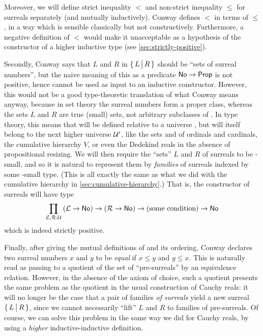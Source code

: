 Moreover, we will define strict inequality $<$ and non-strict inequality $\le$ for surreals separately (and mutually inductively).
Conway defines $<$ in terms of $\le$, in a way which is sensible classically but not constructively.
%
Furthermore, a negative definition of $<$ would make it unacceptable as a hypothesis of the constructor of a higher inductive type (see \cref{sec:strictly-positive}).

Secondly, Conway says that $L$ and $R$ in $\{\,L\,\big|\,R\,\}$ should be ``sets of surreal numbers'', but the naive meaning of this as a predicate $\mathsf{No}\to\mathsf{Prop}$ is not positive, hence cannot be used as input to an inductive constructor.
However, this would not be a good type-theoretic translation of what Conway means anyway, because in set theory the surreal numbers form a proper class, whereas the sets $L$ and $R$ are true (small) sets, not arbitrary subclasses of \NO.
In type theory, this means that \NO will be defined relative to a universe \UU, but will itself belong to the next higher universe $\mathcal{U}'$, like the sets \ord and \card of ordinals and cardinals, the cumulative hierarchy $V$, or even the Dedekind reals in the absence of propositional resizing.
%
We will then require the ``sets'' $L$ and $R$ of surreals to be \UU-small, and so it is natural to represent them by \emph{families} of surreals indexed by some \UU-small type.
(This is all exactly the same as what we did with the cumulative hierarchy in \cref{sec:cumulative-hierarchy}.)
That is, the constructor of surreals will have type
\[ \prd{\LL,\RR:\UU} (\LL\to\NO) \to (\RR\to \NO) \to (\text{some condition}) \to \NO \]
which is indeed strictly positive.

Finally, after giving the mutual definitions of \NO and its ordering, Conway declares two surreal numbers $x$ and $y$ to be \emph{equal} if $x\le y$ and $y\le x$.
This is naturally read as passing to a quotient of the set of ``pre-surreals'' by an equivalence relation.
However, in the absence of the axiom of choice, such a quotient presents the same problem as the quotient in the usual construction of Cauchy reals: it will no longer be the case that a pair of families \emph{of surreals} yield a new surreal $\{\,L\,\big|\,R\,\}$, since we cannot necessarily ``lift'' $L$ and $R$ to families of pre-surreals.
Of course, we can solve this problem in the same way we did for Cauchy reals, by using a \emph{higher} inductive-inductive definition.

